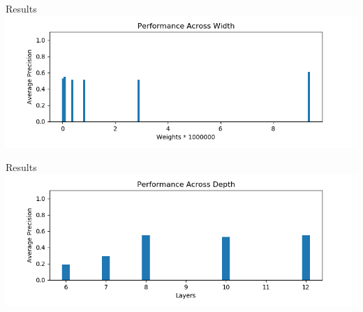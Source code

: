 \documentclass{beamer}
\begin{document}
\begin{darkframes}

\begin{frame}{Results}
\includegraphics[width=\textwidth]{../../thesis/fig/perf_width}
\end{frame}

\begin{frame}{Results}
\includegraphics[width=\textwidth]{../../thesis/fig/perf_depth}
\end{frame}



\end{darkframes}
\end{document}
